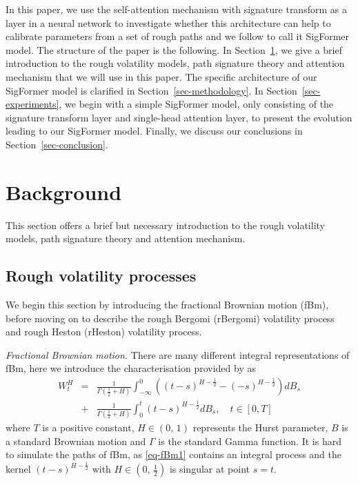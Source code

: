 \documentclass[]{article}
\renewcommand{\(}{\left(}
\renewcommand{\)}{\right)}
\begin{document}
	In this paper, we use the self-attention mechanism with signature transform as a layer in a neural network to investigate whether this architecture can help to calibrate parameters from a set of rough paths and we follow \cite{tong_2023} to call it SigFormer model. The structure of the paper is the following. In Section~\ref{sec-background}, we give a brief introduction to the rough volatility models, path signature theory and attention mechanism that we will use in this paper. The specific architecture of our SigFormer model is clarified in Section~\ref{sec-methodology}. In Section~\ref{sec-experiments}, we begin with a simple SigFormer model, only consisting of the signature transform layer and single-head attention layer, to present the evolution leading to our SigFormer model. Finally, we discuss our conclusions in Section~\ref{sec-conclusion}.
	\section{Background}\label{sec-background}
	This section offers a brief but necessary introduction to the rough volatility models, path signature theory and attention mechanism.
	
	\subsection{Rough volatility processes}\label{subsec-rough}
	We begin this section by introducing the fractional Brownian motion (fBm), before moving on to describe the rough Bergomi (rBergomi) volatility process and rough Heston (rHeston) volatility process.
	
	\textit{Fractional Brownian motion.} There are many different integral representations of fBm, here we introduce the characterisation provided by \cite{mandelbrot_1968_fbm} as
	\begin{eqnarray}
		\label{eq-fBm1}
		W_t^H
		&=& \frac{1}{\Gamma\(\frac{1}{2}+H\)}\int_{-\infty}^{0} \(\(t-s\)^{H-\frac{1}{2}}-\(-s\)^{H-\frac{1}{2}}\)dB_s \nonumber\\
		&+& \frac{1}{\Gamma\(\frac{1}{2}+H\)}\int_{0}^{t} \(t-s\)^{H-\frac{1}{2}}dB_s,\quad t\in[0,T]
	\end{eqnarray}
	where $T$ is a positive constant, $H\in(0,\,1)$ represents the Hurst parameter, $B$ is a standard Brownian motion and $\Gamma$ is the standard Gamma function. It is hard to simulate the paths of fBm, as \eqref{eq-fBm1} contains an integral process and the kernel $\(t-s\)^{H-\frac{1}{2}}$ with $H\in(0,\,\frac{1}{2})$ is singular at point $s=t$.
	
\end{document}
